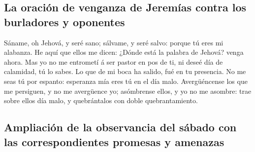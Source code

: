 \hypertarget{la-oraciuxf3n-de-venganza-de-jeremuxedas-contra-los-burladores-y-oponentes}{%
\subsection{La oración de venganza de Jeremías contra los burladores y
oponentes}\label{la-oraciuxf3n-de-venganza-de-jeremuxedas-contra-los-burladores-y-oponentes}}

 Sáname, oh Jehová, y seré sano; sálvame, y seré salvo:
porque tú eres mi alabanza.  He aquí que ellos me dicen:
¿Dónde está la palabra de Jehová? venga ahora.  Mas yo no
me entrometí á ser pastor en pos de ti, ni deseé día de calamidad, tú lo
sabes. Lo que de mi boca ha salido, fué en tu presencia. 
No me seas tú por espanto: esperanza mía eres tú en el día malo.
 Avergüéncense los que me persiguen, y no me avergüence
yo; asómbrense ellos, y yo no me asombre: trae sobre ellos día malo, y
quebrántalos con doble quebrantamiento.

\hypertarget{ampliaciuxf3n-de-la-observancia-del-suxe1bado-con-las-correspondientes-promesas-y-amenazas}{%
\subsection{Ampliación de la observancia del sábado con las
correspondientes promesas y
amenazas}\label{ampliaciuxf3n-de-la-observancia-del-suxe1bado-con-las-correspondientes-promesas-y-amenazas}}

